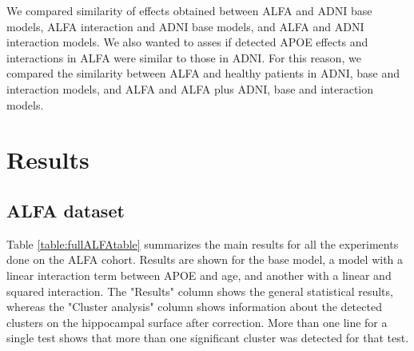 We compared similarity of effects obtained between ALFA and ADNI base models, ALFA interaction and ADNI base models, and ALFA and ADNI interaction models. We also wanted to asses if detected APOE effects and interactions in ALFA were similar to those in ADNI. For this reason, we compared the similarity between ALFA and healthy patients in ADNI, base and interaction models, and ALFA and ALFA plus ADNI, base and interaction models.

\section{Results}
\label{sec:results}

\subsection{ALFA dataset}

Table \ref{table:fullALFAtable} summarizes the main results for all the experiments done on the ALFA cohort. Results are shown for the base model, a model with a linear interaction term between APOE and age, and another with a linear and squared interaction. The "Results" column shows the general statistical results, whereas the "Cluster analysis" column shows information about the detected clusters on the hippocampal surface after correction. More than one line for a single test shows that more than one significant cluster was detected for that test. \\

